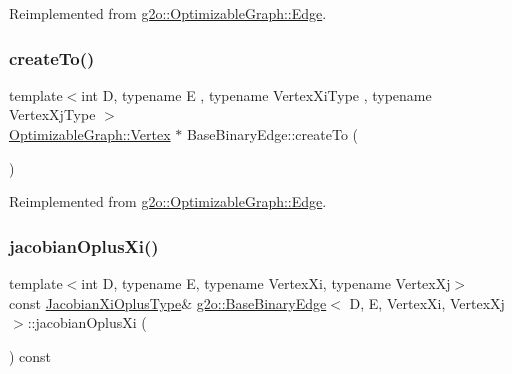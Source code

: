 Reimplemented from \mbox{\hyperlink{classg2o_1_1_optimizable_graph_1_1_edge_abd98d7a174df25bcc82cfdacba682fec}{g2o\+::\+Optimizable\+Graph\+::\+Edge}}.

\mbox{\label{classg2o_1_1_base_binary_edge_ac7cce17e3229445e5a33c3cb8a569320}} 
\subsubsection{\texorpdfstring{create\+To()}{createTo()}}
{\footnotesize\ttfamily template$<$int D, typename E , typename Vertex\+Xi\+Type , typename Vertex\+Xj\+Type $>$ \\
\mbox{\hyperlink{classg2o_1_1_optimizable_graph_1_1_vertex}{Optimizable\+Graph\+::\+Vertex}} $\ast$ Base\+Binary\+Edge\+::create\+To (\begin{DoxyParamCaption}{ }\end{DoxyParamCaption})\hspace{0.3cm}{\ttfamily [virtual]}}



Reimplemented from \mbox{\hyperlink{classg2o_1_1_optimizable_graph_1_1_edge_a39c22b396ab312059ea8fa4c2776be2e}{g2o\+::\+Optimizable\+Graph\+::\+Edge}}.

\mbox{\label{classg2o_1_1_base_binary_edge_a5232f0a5f116e7106b7968ab3bff036c}} 
\subsubsection{\texorpdfstring{jacobian\+Oplus\+Xi()}{jacobianOplusXi()}}
{\footnotesize\ttfamily template$<$int D, typename E, typename Vertex\+Xi, typename Vertex\+Xj$>$ \\
const \mbox{\hyperlink{classg2o_1_1_base_binary_edge_ab1cde84224b129603bcd95db027e0167}{Jacobian\+Xi\+Oplus\+Type}}\& \mbox{\hyperlink{classg2o_1_1_base_binary_edge}{g2o\+::\+Base\+Binary\+Edge}}$<$ D, E, Vertex\+Xi, Vertex\+Xj $>$\+::jacobian\+Oplus\+Xi (\begin{DoxyParamCaption}{ }\end{DoxyParamCaption}) const\hspace{0.3cm}{\ttfamily [inline]}}



